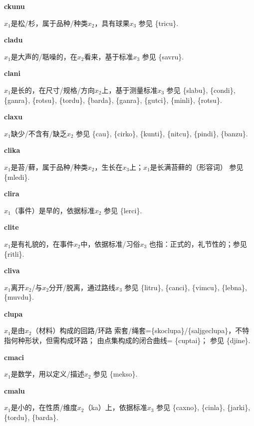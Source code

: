 \documentclass[notitlepage,twocolumn,a4paper,10pt]{book}
\begin{document}
{\sffamily\bfseries ckunu}\enspace {\ttfamily\bfseries[        ku'u]}  $x_1$是松\slash{}杉，属于品种\slash{}种类$x_2$，具有球果$x_3$ \textemdash{} 参见 \{tricu\}.

{\sffamily\bfseries cladu}\enspace {\ttfamily\bfseries[        lau]}  $x_1$是大声的\slash{}聒噪的，在$x_2$看来，基于标准$x_3$ \textemdash{} 参见 \{savru\}.

{\sffamily\bfseries clani}\enspace {\ttfamily\bfseries[    cla]}  $x_1$是长的，在尺寸\slash{}规格\slash{}方向$x_2$上，基于测量标准$x_3$ \textemdash{} 参见 \{slabu\}, \{condi\}, \{ganra\}, \{rotsu\}, \{tordu\}, \{barda\}, \{ganra\}, \{gutci\}, \{minli\}, \{rotsu\}.

{\sffamily\bfseries claxu}\enspace {\ttfamily\bfseries[        cau]}  $x_1$缺少\slash{}不含有\slash{}缺乏$x_2$ \textemdash{} 参见 \{cau\}, \{cirko\}, \{kunti\}, \{nitcu\}, \{pindi\}, \{banzu\}.

{\sffamily\bfseries clika} $x_1$是苔\slash{}藓，属于品种\slash{}种类$x_2$，生长在$x_3$上；$x_1$是长满苔藓的（形容词） \textemdash{} 参见 \{mledi\}.

{\sffamily\bfseries clira}\enspace {\ttfamily\bfseries[lir]}  $x_1$（事件）是早的，依据标准$x_2$ \textemdash{} 参见 \{lerci\}.

{\sffamily\bfseries clite}\enspace {\ttfamily\bfseries[lit]}  $x_1$是有礼貌的，在事件$x_2$中，依据标准\slash{}习俗$x_3$ \textemdash{} 也指：正式的，礼节性的；参见 \{ritli\}.

{\sffamily\bfseries cliva}\enspace {\ttfamily\bfseries[liv     li'a]}  $x_1$离开$x_2$\slash{}与$x_2$分开\slash{}脱离，通过路线$x_3$ \textemdash{} 参见 \{litru\}, \{canci\}, \{vimcu\}, \{lebna\}, \{muvdu\}.

{\sffamily\bfseries clupa}\enspace {\ttfamily\bfseries[cup]}  $x_1$是由$x_2$（材料）构成的回路\slash{}环路 \textemdash{} 索套\slash{}绳套=\{skoclupa\}\slash{}\{saljgeclupa\}，不特指何种形状，但需构成环路； 由点集构成的闭合曲线= \{cuptai\}； 参见 \{djine\}.

{\sffamily\bfseries cmaci} $x_1$是数学，用以定义\slash{}描述$x_2$ \textemdash{} 参见 \{mekso\}.

{\sffamily\bfseries cmalu}\enspace {\ttfamily\bfseries[    cma]}  $x_1$是小的，在性质\slash{}维度$x_2$（ka）上，依据标准$x_3$ \textemdash{} 参见 \{caxno\}, \{cinla\}, \{jarki\}, \{tordu\}, \{barda\}.
\end{document}
